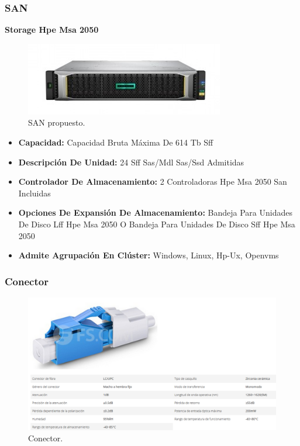 \documentclass[12pt,letterpaper]{article}
\begin{document}
\newpage
\subsubsection{SAN}
\textbf{Storage Hpe Msa 2050}
\begin{figure}[ht]
    \centering
    \includegraphics[scale=.6]{imagenes/san.jpg}
    \caption{SAN propuesto.}
\end{figure}
\begin{itemize}
    \item \textbf{Capacidad: }Capacidad Bruta Máxima De 614 Tb Sff
    \item \textbf{Descripción De Unidad: }24 Sff Sas/Mdl Sas/Ssd Admitidas
    \item \textbf{Controlador De Almacenamiento: }2 Controladoras Hpe Msa 2050 San Incluidas
    \item \textbf{Opciones De Expansión De Almacenamiento: }Bandeja Para Unidades De Disco Lff Hpe Msa 2050 O Bandeja Para Unidades De Disco Sff Hpe Msa 2050
    \item \textbf{Admite Agrupación En Clúster: }Windows, Linux, Hp-Ux, Openvms
\end{itemize}

\subsubsection{Conector}
\begin{figure}[ht]
    \centering
    \includegraphics[scale=.55]{imagenes/conect.png}
    \caption{Conector.}
\end{figure}
\end{document}
